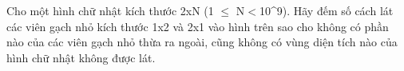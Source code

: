Cho một hình chữ nhật kích thước 2xN (1 $\le$ N$<$10^9). Hãy đếm số cách lát các viên gạch nhỏ kích thước 1x2 và 2x1 vào hình trên sao cho không có phần nào của các viên gạch nhỏ thừa ra ngoài, cũng không có vùng diện tích nào của hình chữ nhật không được lát.  

\